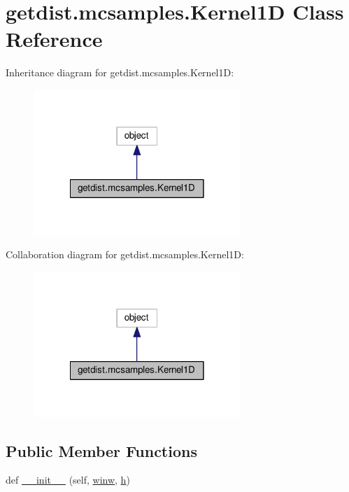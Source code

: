 \hypertarget{classgetdist_1_1mcsamples_1_1Kernel1D}{}\section{getdist.\+mcsamples.\+Kernel1D Class Reference}
\label{classgetdist_1_1mcsamples_1_1Kernel1D}


Inheritance diagram for getdist.\+mcsamples.\+Kernel1D\+:
\nopagebreak
\begin{figure}[H]
\begin{center}
\leavevmode
\includegraphics[width=222pt]{classgetdist_1_1mcsamples_1_1Kernel1D__inherit__graph}
\end{center}
\end{figure}


Collaboration diagram for getdist.\+mcsamples.\+Kernel1D\+:
\nopagebreak
\begin{figure}[H]
\begin{center}
\leavevmode
\includegraphics[width=222pt]{classgetdist_1_1mcsamples_1_1Kernel1D__coll__graph}
\end{center}
\end{figure}
\subsection*{Public Member Functions}
\begin{DoxyCompactItemize}
\item 
def \mbox{\hyperlink{classgetdist_1_1mcsamples_1_1Kernel1D_ac73176fb74e465d22387b301fbf66a32}{\+\_\+\+\_\+init\+\_\+\+\_\+}} (self, \mbox{\hyperlink{classgetdist_1_1mcsamples_1_1Kernel1D_a897ce9e9a0b0f403e8d6111badf3a2cf}{winw}}, \mbox{\hyperlink{classgetdist_1_1mcsamples_1_1Kernel1D_a95db9c9ddddc733eace8160174ec27dd}{h}})
\end{DoxyCompactItemize}

